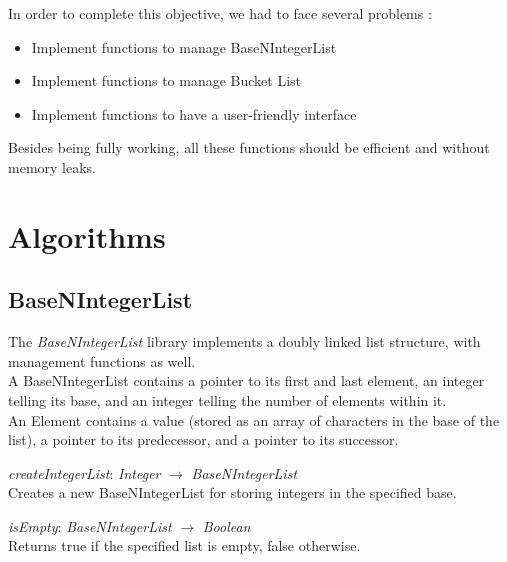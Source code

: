 \documentclass[book, backcover, english, nodocumentinfo]{upmethodology-document}
\begin{document}
In order to complete this objective, we had to face several problems :
\begin{itemize}
	\item{} Implement functions to manage BaseNIntegerList
	\item{} Implement functions to manage Bucket List
	\item{} Implement functions to have a user-friendly interface
\end{itemize}

Besides being fully working, all these functions should be efficient and without memory leaks.

\chapter{Algorithms} \label{chapter:Algorithms}
	\section{BaseNIntegerList}
	The \textit{BaseNIntegerList} library implements a doubly linked list structure, with management functions as well.\\
	A BaseNIntegerList contains a pointer to its first and last element, an integer telling its base, and an integer telling the number of elements within it.\\
	An Element contains a value (stored as an array of characters in the base of the list), a pointer to its predecessor, and a pointer to its successor.\\

		\begin{minipage}{\linewidth}
			\textit{createIntegerList}: \textit{Integer} $\rightarrow$ \textit{BaseNIntegerList}\\
			Creates a new BaseNIntegerList for storing integers in the specified base.
			\label{algo:BNIL-CreateIntegerList}
			
		\end{minipage}
		\nxtalgo{}

		\begin{minipage}{\linewidth}
			\textit{isEmpty}: \textit{BaseNIntegerList} $\rightarrow$ \textit{Boolean}\\
			Returns true if the specified list is empty, false otherwise.
			\label{algo:BNIL-IsEmpty}
			
		\end{minipage}
		\nxtalgo{}
\end{document}
